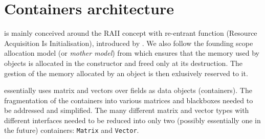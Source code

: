 \section{Containers architecture}\label{sec:container}
%
\linbox is mainly conceived around the RAII concept with re-entrant function
(Resource Acquisition Is Initialisation), introduced by
\cite{stroustrup1994design}. We also follow the {founding scope allocation}
model (or \emph{mother model}) from \cite{Dumas:2010:lbpar} which ensures that
the memory used by objects is allocated in the constructor and freed only at
its destruction. The gestion of the memory allocated by an object is then
exlusively reserved to it.
%
\par
%
\linbox essentially uses matrix and vectors over fields as data objects
(containers).  The fragmentation of the containers into various matrices and
blackboxes needed to be addressed and simplified. The many different matrix and
vector types with different interfaces needed to be reduced into only two
(possibly essentially one in the future) containers: \texttt{Matrix} and
\texttt{Vector}.
%
